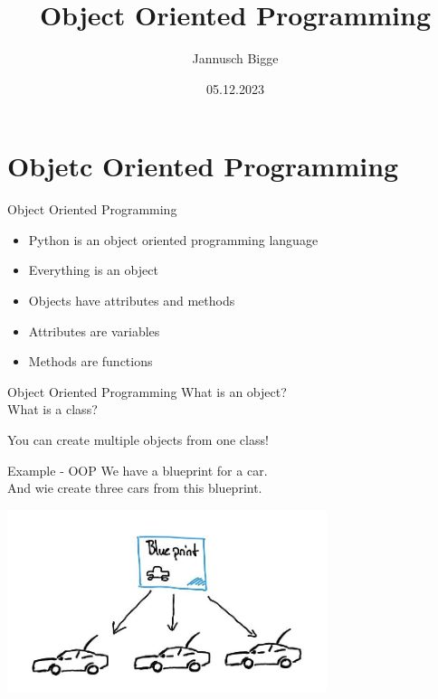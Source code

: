 \documentclass{beamer}
\title{Object Oriented Programming}
\author{Jannusch Bigge}
\date{05.12.2023}
\begin{document}
\begin{frame}
    \titlepage
\end{frame}

\section{Objetc Oriented Programming}

\begin{frame}{Object Oriented Programming}
    \begin{itemize}
        \item Python is an object oriented programming language
        \item Everything is an object
        \item Objects have attributes and methods
        \item Attributes are variables
        \item Methods are functions
    \end{itemize}
\end{frame}

\begin{frame}[fragile]{Object Oriented Programming}
    What is an object?\\\pause
    \pause
    What is a class?
    \pause
\begin{alertblock}{You can create multiple objects from one class!}
    
\end{alertblock}
\end{frame}

\begin{frame}{Example - OOP}
We have a blueprint for a car.\\
And wie create three cars from this blueprint.\pause
    \begin{center}
        \includegraphics[width=0.7\textwidth]{figures/nomal.jpg}
    \end{center}
\end{frame}
\end{document}
